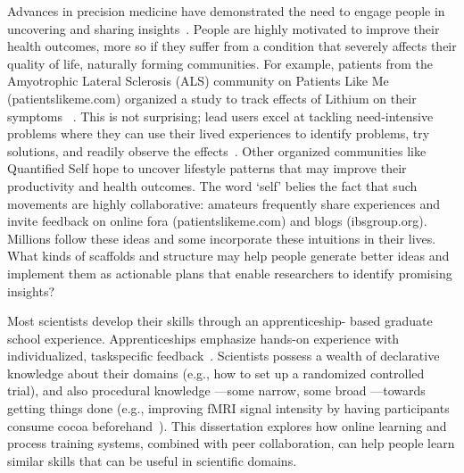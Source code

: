 Advances in precision medicine have demonstrated the need
to engage people in uncovering and sharing insights~\cite{Aronson2015}. People
are highly motivated to improve their health outcomes,
more so if they suffer from a condition that severely affects
their quality of life, naturally forming communities. For example,
patients from the Amyotrophic Lateral Sclerosis
(ALS) community on Patients Like Me (patientslikeme.com)
organized a study to track effects of Lithium on their symptoms
~\cite{Wicks2011}. This is not surprising; lead users excel at tackling
need-intensive problems where they can use their lived
experiences to identify problems, try solutions, and readily
observe the effects~\cite{VonHippel2005}. Other organized communities like
Quantified Self hope to uncover lifestyle patterns that may
improve their productivity and health outcomes. The word
‘self’ belies the fact that such movements are highly collaborative:
amateurs frequently share experiences and invite
feedback on online fora (patientslikeme.com) and blogs
(ibsgroup.org). Millions follow these ideas and some incorporate
these intuitions in their lives. What kinds of scaffolds
and structure may help people generate better ideas and implement them as actionable plans that
enable researchers to identify promising insights?


Most scientists develop their skills through an apprenticeship-
based graduate school experience. Apprenticeships emphasize
hands-on experience with individualized, taskspecific
feedback~\cite{schon1984reflective}. Scientists possess a wealth of declarative
knowledge about their domains (e.g., how to set up a
randomized controlled trial), and also procedural knowledge
—some narrow, some broad —towards getting things done
(e.g., improving fMRI signal intensity by having participants
consume cocoa beforehand~\cite{Francis2006}). This dissertation explores how
online learning and process training systems, combined with
peer collaboration, can help people learn similar skills that
can be useful in scientific domains.

